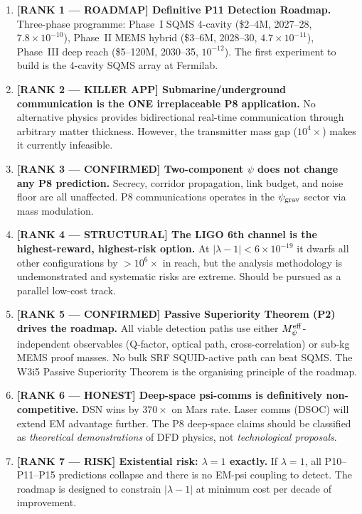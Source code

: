 \documentclass[11pt]{article}
\theoremstyle{definition}
\theoremstyle{remark}
\newcommand{\ee}[1]{\times 10^{#1}}
\newcommand{\psigrav}{\psi_{\rm grav}}
\newcommand{\lam}{\lambda}
\newcommand{\lamdiff}{|\lambda-1|}
\newcommand{\Meff}{M_\psi^{\rm eff}}
\begin{document}
\begin{enumerate}

\item \textbf{[RANK 1 --- ROADMAP] Definitive P11 Detection Roadmap.}
  Three-phase programme: Phase~I SQMS 4-cavity (\$2--4M, 2027--28,
  $7.8\ee{-10}$), Phase~II MEMS hybrid (\$3--6M, 2028--30, $4.7\ee{-11}$),
  Phase~III deep reach (\$5--120M, 2030--35, $10^{-12}$).
  The first experiment to build is the 4-cavity SQMS array at Fermilab.

\item \textbf{[RANK 2 --- KILLER APP] Submarine/underground communication
  is the ONE irreplaceable P8 application.}
  No alternative physics provides bidirectional real-time communication
  through arbitrary matter thickness. However, the transmitter mass gap
  ($10^4\times$) makes it currently infeasible.

\item \textbf{[RANK 3 --- CONFIRMED] Two-component $\psi$ does not change
  any P8 prediction.}
  Secrecy, corridor propagation, link budget, and noise floor are all
  unaffected. P8 communications operates in the $\psigrav$ sector via
  mass modulation.

\item \textbf{[RANK 4 --- STRUCTURAL] The LIGO 6th channel is the
  highest-reward, highest-risk option.}
  At $\lamdiff < 6\ee{-19}$ it dwarfs all other configurations by
  $>10^6\times$ in reach, but the analysis methodology is undemonstrated
  and systematic risks are extreme. Should be pursued as a parallel
  low-cost track.

\item \textbf{[RANK 5 --- CONFIRMED] Passive Superiority Theorem (P2)
  drives the roadmap.}
  All viable detection paths use either $\Meff$-independent observables
  (Q-factor, optical path, cross-correlation) or sub-kg MEMS proof masses.
  No bulk SRF SQUID-active path can beat SQMS. The W3i5 Passive
  Superiority Theorem is the organising principle of the roadmap.

\item \textbf{[RANK 6 --- HONEST] Deep-space psi-comms is definitively
  non-competitive.}
  DSN wins by $370\times$ on Mars rate. Laser comms (DSOC) will extend EM
  advantage further. The P8 deep-space claims should be classified as
  \emph{theoretical demonstrations} of DFD physics, not \emph{technological
  proposals}.

\item \textbf{[RANK 7 --- RISK] Existential risk: $\lam = 1$ exactly.}
  If $\lam = 1$, all P10--P11--P15 predictions collapse and there is no
  EM-psi coupling to detect. The roadmap is designed to constrain $\lamdiff$
  at minimum cost per decade of improvement.

\end{enumerate}
\end{document}
